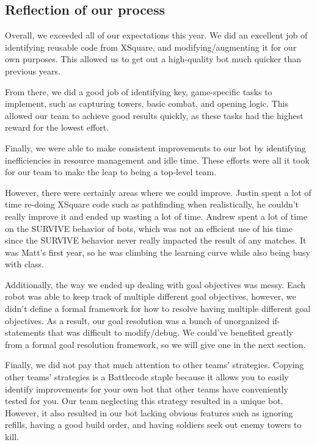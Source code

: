 \subsection{Reflection of our process}

Overall, we exceeded all of our expectations this year. We did an excellent job of identifying reusable code from XSquare, and modifying/augmenting it for our own purposes. This allowed us to get out a high-quality bot much quicker than previous years.

\medskip

From there, we did a good job of identifying key, game-specific tasks to implement, such as capturing towers, basic combat, and opening logic. This allowed our team to achieve good results quickly, as these tasks had the highest reward for the lowest effort.

\medskip

Finally, we were able to make consistent improvements to our bot by identifying inefficiencies in resource management and idle time. These efforts were all it took for our team to make the leap to being a top-level team.

\medskip

However, there were certainly areas where we could improve. Justin spent a lot of time re-doing XSquare code such as pathfinding when realistically, he couldn't really improve it and ended up wasting a lot of time. Andrew spent a lot of time on the SURVIVE behavior of bots, which was not an efficient use of his time since the SURVIVE behavior never really impacted the result of any matches. It was Matt's first year, so he was climbing the learning curve while also being busy with class.

\medskip

Additionally, the way we ended up dealing with goal objectives was messy. Each robot was able to keep track of multiple different goal objectives, however, we didn't define a formal framework for how to resolve having multiple different goal objectives. As a result, our goal resolution was a bunch of unorganized if-statements that was difficult to modify/debug. We could've benefited greatly from a formal goal resolution framework, so we will give one in the next section.

\medskip

Finally, we did not pay that much attention to other teams' strategies. Copying other teams' strategies is a Battlecode staple because it allows you to easily identify improvements for your own bot that other teams have conveniently tested for you. Our team neglecting this strategy resulted in a unique bot. However, it also resulted in our bot lacking obvious features such as ignoring refills, having a good build order, and having soldiers seek out enemy towers to kill.

